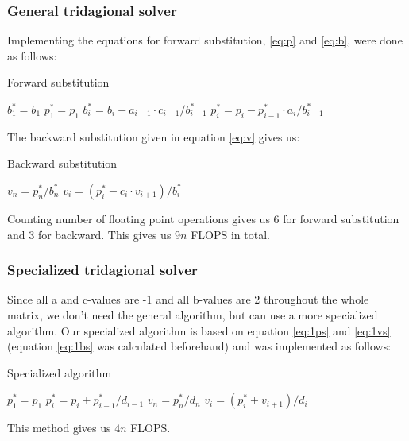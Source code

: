 \documentclass[12pt,a4paper]{article}
\newcommand{\s}{^{*}}
\begin{document}
\subsubsection*{General tridagional solver}
Implementing the equations for forward substitution, \eqref{eq:p} and \eqref{eq:b}, were done as follows: 
\begin{algorithm}[H]
\small
\caption{Forward substitution}\label{alg:tri_forward}
\begin{algorithmic}[1]
\State $b_1^* = b_1$
\State $p_1^* = p_1$
\State $b_i^* = b_i - a_{i-1}\cdot c_{i-1}/b_{i-1}^*$
\State $p_i^* = p_i - p_{i-1}^*\cdot a_i/b_{i-1}^*$
\EndFor
\end{algorithmic}
\end{algorithm}
The backward substitution given in equation \eqref{eq:v} gives us:
\begin{algorithm}[H]
\small
\caption{Backward substitution}\label{alg:tri_backward}
\begin{algorithmic}[1]
\State $v_n = p_n\s/b_n\s$
\State $v_i = (p_i\s - c_i \cdot v_{i+1})/b_i\s$
\EndFor
\end{algorithmic}
\end{algorithm}
Counting number of floating point operations gives us 6 for forward substitution and 3 for backward. This gives us $9n$ FLOPS in total.
\subsubsection*{Specialized tridagional solver}
Since all a and c-values are -1 and all b-values are 2 throughout the whole matrix, we don't need the general algorithm, but can use a more specialized algorithm. Our specialized algorithm is based on equation \eqref{eq:1ps} and \eqref{eq:1vs} (equation \eqref{eq:1bs} was calculated beforehand) and was implemented as follows:
\begin{algorithm}[H]
\small
\caption{Specialized algorithm}\label{alg:tri_special}
\begin{algorithmic}[1]
\State $p_1^* = p_1$
 
\State $p_i^* = p_i + p_{i-1}^*/d_{i-1}$
\EndFor
\State $v_n = p_n^*/d_n$
 
\State $v_i = (p_i^* + v_{i+1})/d_i$ 
\EndFor
\end{algorithmic}
\end{algorithm}
This method gives us $4n$ FLOPS.
\end{document}
